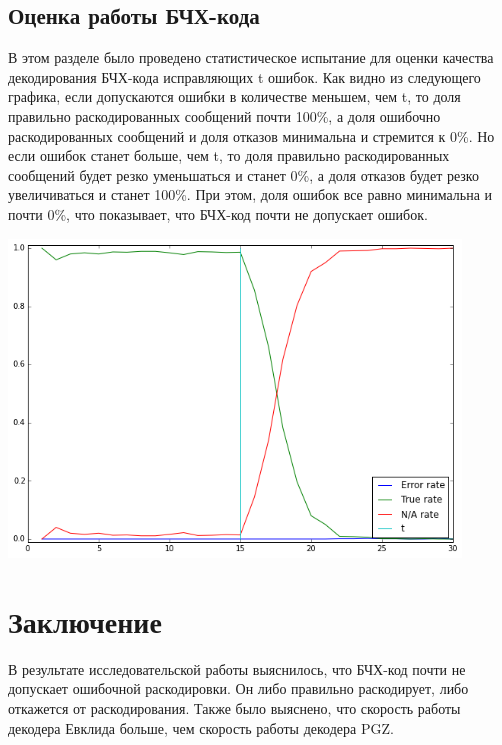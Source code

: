 \documentclass[12pt, a4paper]{article}
\begin{document}
		\subsection{Оценка работы БЧХ-кода}
			В этом разделе было проведено статистическое испытание для оценки качества декодирования БЧХ-кода исправляющих t ошибок. Как видно из следующего графика, если допускаются ошибки в количестве меньшем, чем t, то доля правильно раскодированных сообщений почти 100\%, а доля ошибочно раскодированных сообщений и доля отказов минимальна и стремится к 0\%. Но если ошибок станет больше, чем t, то доля правильно раскодированных сообщений будет резко уменьшаться и станет 0\%, а доля отказов будет резко увеличиваться и станет 100\%. При этом, доля ошибок все равно минимальна и почти 0\%, что показывает, что БЧХ-код почти не допускает ошибок.
			\begin{center}
				\includegraphics[width=12cm]{rates.png}
			\end{center}



	\newpage
	\section{Заключение}
		В результате исследовательской работы выяснилось, что БЧХ-код почти не допускает ошибочной раскодировки. Он либо правильно раскодирует, либо откажется от раскодирования. Также было выяснено, что скорость работы декодера Евклида больше, чем скорость работы декодера PGZ.
\end{document}
